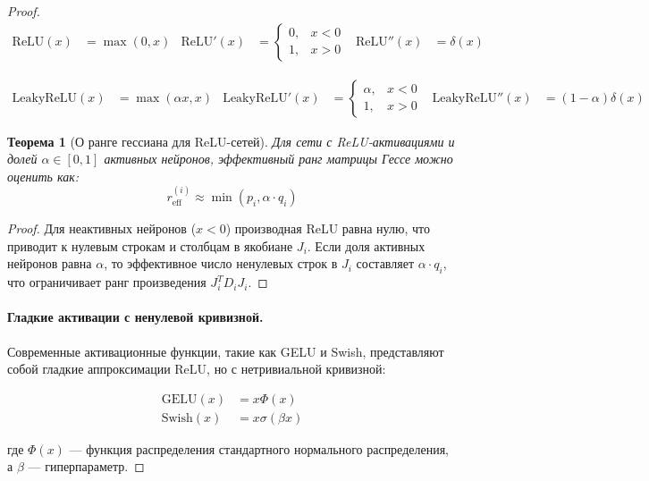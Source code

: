 \documentclass[a4paper,12pt]{article}
\newtheorem{theorem}{Теорема}
\begin{document}
\begin{proof}
    \begin{align}
    \text{ReLU}(x) &= \max(0,x) &\text{ReLU}'(x) &= 
    \begin{cases}
    0, & x < 0 \\
    1, & x > 0
    \end{cases} &\text{ReLU}''(x) &= \delta(x)
    \end{align}
    
    \begin{align}
    \text{LeakyReLU}(x) &= \max(\alpha x, x) &\text{LeakyReLU}'(x) &= 
    \begin{cases}
    \alpha, & x < 0 \\
    1, & x > 0
    \end{cases} &\text{LeakyReLU}''(x) &= (1-\alpha)\delta(x)
    \end{align}
    
    \begin{theorem}[О ранге гессиана для ReLU-сетей]
    Для сети с ReLU-активациями и долей $\alpha \in [0,1]$ активных нейронов, эффективный ранг матрицы Гессе можно оценить как:
    \begin{equation}
    r_{\text{eff}}^{(i)} \approx \min(p_i, \alpha \cdot q_i)
    \end{equation}
    \end{theorem}
    
    \begin{proof}
    Для неактивных нейронов ($x < 0$) производная ReLU равна нулю, что приводит к нулевым строкам и столбцам в якобиане $J_i$. Если доля активных нейронов равна $\alpha$, то эффективное число ненулевых строк в $J_i$ составляет $\alpha \cdot q_i$, что ограничивает ранг произведения $J_i^T D_i J_i$.
    \end{proof}
    
    \paragraph{Гладкие активации с ненулевой кривизной.}
    Современные активационные функции, такие как GELU и Swish, представляют собой гладкие аппроксимации ReLU, но с нетривиальной кривизной:
    
    \begin{align}
    \text{GELU}(x) &= x\Phi(x) \\
    \text{Swish}(x) &= x\sigma(\beta x)
    \end{align}
    
    где $\Phi(x)$ — функция распределения стандартного нормального распределения, а $\beta$ — гиперпараметр.
    

\end{proof}
\end{document}
